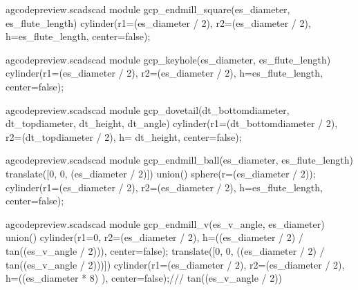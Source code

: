 \documentclass{ltxdoc}
\begin{document}
\lstset{firstnumber=\thegcpscad}
\begin{writecode}{a}{gcodepreview.scad}{scad}
module gcp_endmill_square(es_diameter, es_flute_length) {
  cylinder(r1=(es_diameter / 2), r2=(es_diameter / 2), h=es_flute_length, center=false);
}

\end{writecode}
\addtocounter{gcpscad}{4}

\lstset{firstnumber=\thegcpscad}
\begin{writecode}{a}{gcodepreview.scad}{scad}
module gcp_keyhole(es_diameter, es_flute_length) {
  cylinder(r1=(es_diameter / 2), r2=(es_diameter / 2), h=es_flute_length, center=false);
}

\end{writecode}
\addtocounter{gcpscad}{4}

\lstset{firstnumber=\thegcpscad}
\begin{writecode}{a}{gcodepreview.scad}{scad}
module gcp_dovetail(dt_bottomdiameter, dt_topdiameter, dt_height, dt_angle) {
  cylinder(r1=(dt_bottomdiameter / 2), r2=(dt_topdiameter / 2), h= dt_height, center=false);
}

\end{writecode}
\addtocounter{gcpscad}{4}

\lstset{firstnumber=\thegcpscad}
\begin{writecode}{a}{gcodepreview.scad}{scad}
module gcp_endmill_ball(es_diameter, es_flute_length) {
  translate([0, 0, (es_diameter / 2)]){
    union(){
      sphere(r=(es_diameter / 2));
      cylinder(r1=(es_diameter / 2), r2=(es_diameter / 2), h=es_flute_length, center=false);
    }
  }
}

\end{writecode}
\addtocounter{gcpscad}{9}

\lstset{firstnumber=\thegcpscad}
\begin{writecode}{a}{gcodepreview.scad}{scad}
module gcp_endmill_v(es_v_angle, es_diameter) {
  union(){
    cylinder(r1=0, r2=(es_diameter / 2), h=((es_diameter / 2) / tan((es_v_angle / 2))), center=false);
    translate([0, 0, ((es_diameter / 2) / tan((es_v_angle / 2)))]){
      cylinder(r1=(es_diameter / 2), r2=(es_diameter / 2), h=((es_diameter * 8) ), center=false);/// tan((es_v_angle / 2))
    }
  }
}

\end{writecode}
\addtocounter{gcpscad}{9}
 
\end{document}
